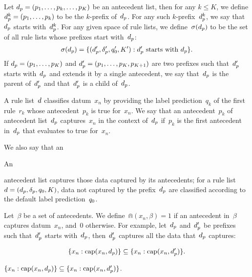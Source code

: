 Let ${d_p = (p_1, \dots, p_k, \dots, p_K)}$ be an antecedent list,
then for any ${k \le K}$, we define ${d_p^k = (p_1, \dots, p_k)}$
to be the $k$-prefix of~$d_p$.
%
For any such $k$-prefix~$d_p^k$,
we say that~$d_p$ starts with~$d_p^k$.
%
For any given space of rule lists,
we define~$\sigma(d_p)$ to be the set of
all rule lists whose prefixes start with~$d_p$:
\begin{align}
\StartsWith(\Prefix) =
\{(\Prefix', \Labels', \Default', K') : \Prefix' \textnormal{ starts with } \Prefix \}.
\label{eq:starts-with}
\end{align}
%
If ${d_p = (p_1, \dots, p_K)}$ and ${d_p' = (p_1, \dots, p_K, p_{K+1})}$
are two prefixes such that~$d_p'$ starts with~$d_p$ and extends it by
a single antecedent, we say that~$d_p$ is the parent of~$d_p'$
and that~$d_p'$ is a child of~$d_p$.

A rule list~${d}$ classifies datum~$x_n$ by providing the label prediction~$q_k$
of the first rule~$r_k$ whose antecedent~$p_k$ is true for~$x_n$.
%
We say that an antecedent~$p_k$ of antecedent list~$d_p$ captures~$x_n$
in the context of~$d_p$ if~$p_k$ is the first antecedent in~$d_p$ that
evaluates to true for~$x_n$.
%
\begin{arxiv}
We also say that an
\end{arxiv}
\begin{kdd}
An
\end{kdd}
antecedent list captures those data captured by its antecedents;
for a rule list~${{d} = (d_p, \delta_p, q_0, K)}$,
data not captured by the prefix~$d_p$
are classified according to the default label prediction~$q_0$.

Let~$\beta$ be a set of antecedents.
%
We define~${\Cap(x_n, \beta) = 1}$ if an antecedent in~$\beta$
captures datum~$x_n$, and~0 otherwise.
%
For example, let~$d_p$ and~$d_p'$ be prefixes such that~$d_p'$ starts
with~$d_p$, then~$d_p'$ captures all the data that~$d_p$ captures:
\begin{arxiv}
\begin{align}
\{x_n: \Cap(x_n, \Prefix)\} \subseteq \{x_n: \Cap(x_n, \Prefix')\}.
\label{eq:cap-subset}
\end{align}
\end{arxiv}
\begin{kdd}
${\{x_n: \textnormal{cap}(x_n, d_p)\} \subseteq \{x_n: \textnormal{cap}(x_n, d_p')\}}$.
\end{kdd}

